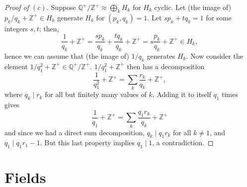 \documentclass[12pt]{article}
\theoremstyle{remark}
\begin{document}
\begin{proof}[Proof of $(c)$]
  Suppose $\mathbb{Q}^+/\mathbb{Z}^+ \approx \bigoplus_k H_k$ for $H_k$ cyclic. Let (the image of) $p_k/q_k + \mathbb{Z}^+ \in H_k$ generate $H_k$ for $(p_k,q_k) = 1$. Let $sp_k+tq_k=1$ for some integers $s,t$; then,
  \begin{equation*}
    \frac{1}{q_k} + \mathbb{Z}^+ = \frac{sp_k}{q_k} + \frac{tq_k}{q_k} + \mathbb{Z}^+ = s\frac{p_k}{q_k} + \mathbb{Z}^+ \in H_k,
  \end{equation*}
  hence we can assume that (the image of) $1/q_k$ generates $H_k$. Now consider the element $1/q_1^2 + \mathbb{Z}^+ \in \mathbb{Q}^+/\mathbb{Z}^+$. $1/q_1^2+\mathbb{Z}^+$ then has a decomposition
  \begin{equation*}
  	\frac{1}{q_1^2} +\mathbb{Z}^+ = \sum_k \frac{r_k}{q_k} + \mathbb{Z}^+,
  \end{equation*}
  where $q_k \mid r_k$ for all but finitely many values of $k$. Adding it to itself $q_1$ times gives
  \begin{equation*}
    \frac{1}{q_1} +\mathbb{Z}^+= \sum_k \frac{q_1r_k}{q_k} + \mathbb{Z}^+
  \end{equation*}
  and since we had a direct sum decomposition, $q_k \mid q_1r_k$ for all $k\ne1$, and $q_1\mid q_1r_1 - 1$. But this last property implies $q_1 \mid 1$, a contradiction.
\end{proof}
\endgroup

\section{Fields}
\setcounter{subsection}{1}
\end{document}
